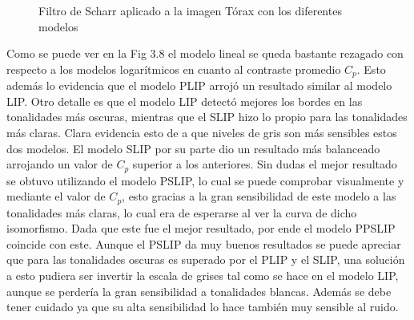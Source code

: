 \begin{figure}
\begin{center}
		\caption{Filtro de Scharr aplicado a la imagen T\'orax con los diferentes modelos}
	\end{center}
\end{figure} 

Como se puede ver en la Fig 3.8 el modelo lineal se queda bastante rezagado con respecto a los modelos logar\'itmicos en cuanto al contraste promedio $C_p$. Esto adem\'as lo evidencia que el modelo PLIP arroj\'o un resultado similar al modelo LIP. Otro detalle es que el modelo LIP detect\'o mejores los bordes en las tonalidades m\'as oscuras, mientras que el SLIP hizo lo propio para las tonalidades m\'as claras. Clara evidencia esto de a que niveles de gris son m\'as sensibles estos dos modelos. El modelo SLIP por su parte dio un resultado m\'as balanceado arrojando un valor de $C_p$ superior a los anteriores. Sin dudas el mejor resultado se obtuvo utilizando el modelo PSLIP, lo cual se puede comprobar visualmente y mediante el valor de $C_p$, esto gracias a la gran sensibilidad de este modelo a las tonalidades m\'as claras, lo cual era de esperarse al ver la curva de dicho isomorfismo. Dada que este fue el mejor resultado, por ende el modelo PPSLIP coincide con este. Aunque el PSLIP da muy buenos resultados se puede apreciar que para las tonalidades oscuras es superado por el PLIP y el SLIP, una soluci\'on a esto pudiera ser invertir la escala de grises tal como se hace en el modelo LIP, aunque se perder\'ia la gran sensibilidad a tonalidades blancas. Adem\'as se debe tener cuidado ya que su alta sensibilidad lo hace tambi\'en muy sensible al ruido.

